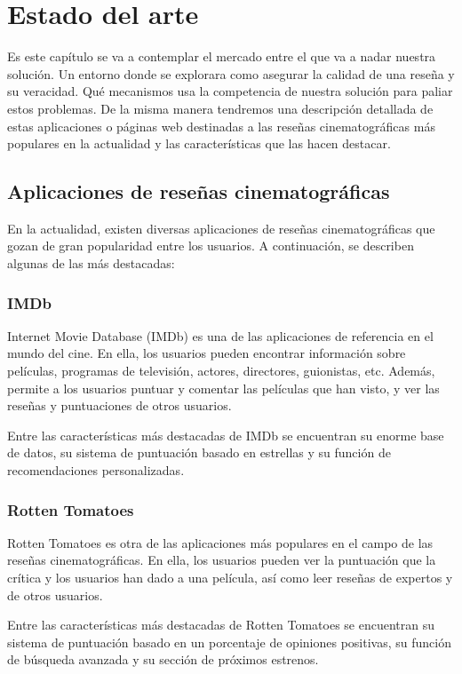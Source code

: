 \chapter{Estado del arte}


Es este capítulo se va a contemplar el mercado entre el que va a nadar nuestra solución. Un entorno donde se explorara como asegurar la calidad de una reseña y su veracidad. Qué mecanismos usa la competencia de nuestra solución para paliar estos problemas. De la misma manera tendremos una descripción detallada de estas aplicaciones o páginas web destinadas a las reseñas cinematográficas más populares en la actualidad y las características que las hacen destacar.


\section{Aplicaciones de reseñas cinematográficas}

En la actualidad, existen diversas aplicaciones de reseñas cinematográficas que gozan de gran 
popularidad entre los usuarios. A continuación, se describen algunas de las más destacadas:

\subsection{IMDb}

Internet Movie Database (IMDb) es una de las aplicaciones de referencia en el mundo del cine. En ella, 
los usuarios pueden encontrar información sobre películas, programas de televisión, actores, 
directores, guionistas, etc. Además, permite a los usuarios puntuar y comentar las películas que han 
visto, y ver las reseñas y puntuaciones de otros usuarios.

Entre las características más destacadas de IMDb se encuentran su enorme base de datos, su sistema de 
puntuación basado en estrellas y su función de recomendaciones personalizadas.

\subsection{Rotten Tomatoes}

Rotten Tomatoes es otra de las aplicaciones más populares en el campo de las reseñas cinematográficas. 
En ella, los usuarios pueden ver la puntuación que la crítica y los usuarios han dado a una película, 
así como leer reseñas de expertos y de otros usuarios.

Entre las características más destacadas de Rotten Tomatoes se encuentran su sistema de puntuación 
basado en un porcentaje de opiniones positivas, su función de búsqueda avanzada y su sección de 
próximos estrenos.

